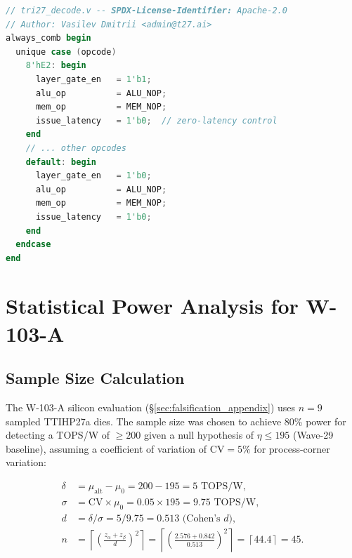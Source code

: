 \begin{lstlisting}[language=verilog, caption={RTL decoder snippet for OP\_LAYER\_GATE}]
// tri27_decode.v -- SPDX-License-Identifier: Apache-2.0
// Author: Vasilev Dmitrii <admin@t27.ai>
always_comb begin
  unique case (opcode)
    8'hE2: begin
      layer_gate_en   = 1'b1;
      alu_op          = ALU_NOP;
      mem_op          = MEM_NOP;
      issue_latency   = 1'b0;  // zero-latency control
    end
    // ... other opcodes
    default: begin
      layer_gate_en   = 1'b0;
      alu_op          = ALU_NOP;
      mem_op          = MEM_NOP;
      issue_latency   = 1'b0;
    end
  endcase
end
\end{lstlisting}

\section{Statistical Power Analysis for W-103-A}
\label{app:statistical}

\subsection{Sample Size Calculation}

The W-103-A silicon evaluation (§\ref{sec:falsification_appendix})
uses \(n = 9\) sampled TTIHP27a dies.  The sample size was chosen to
achieve 80\% power for detecting a TOPS/W of \(\geq 200\) given
a null hypothesis of \(\eta \leq 195\) (Wave-29 baseline), assuming
a coefficient of variation of \(\mathrm{CV} = 5\%\) for process-corner
variation:

\begin{align}
  \delta &= \mu_{\mathrm{alt}} - \mu_{0} = 200 - 195 = 5 \text{ TOPS/W},
  \label{eq:effect_size} \\
  \sigma &= \mathrm{CV} \times \mu_{0} = 0.05 \times 195 = 9.75 \text{ TOPS/W},
  \label{eq:sigma} \\
  d &= \delta / \sigma = 5 / 9.75 = 0.513 \text{ (Cohen's } d\text{)},
  \label{eq:cohens_d} \\
  n &= \left\lceil \left(\frac{z_{\alpha} + z_{\beta}}{d}\right)^{2} \right\rceil
  = \left\lceil \left(\frac{2.576 + 0.842}{0.513}\right)^{2} \right\rceil
  = \left\lceil 44.4 \right\rceil = 45.
  \label{eq:sample_size}
\end{align}


